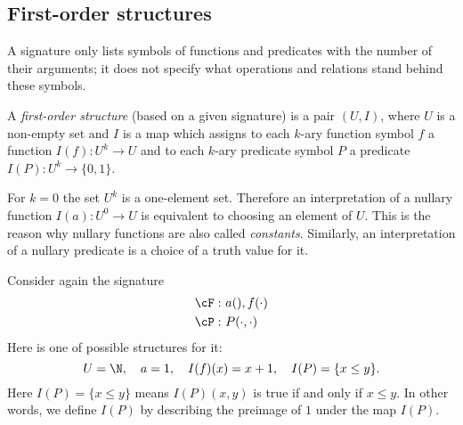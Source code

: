 \begin{page}

\subsection{First-order structures}
A signature only lists symbols of functions and predicates with the number of their arguments;
it does not specify what operations and relations stand behind these symbols.


\end{page}

\begin{page}

\begin{dfn}
A \emph{first-order structure} (based on a given signature) is a pair $(U, I)$, where
$U$ is a non-empty set and $I$ is a map which assigns to each $k$-ary function symbol $f$
a function $I(f) \colon U^k \to U$ and to each $k$-ary predicate symbol $P$ a predicate $I(P) \colon U^k \to \{0,1\}$.
\end{dfn}

\end{page}

\begin{page}


For $k=0$ the set $U^k$ is a one-element set.
Therefore an interpretation of a nullary function $I(a) \colon U^0 \to U$ is equivalent to choosing an element of $U$.
This is the reason why nullary functions are also called \emph{constants}.
Similarly, an interpretation of a nullary predicate is a choice of a truth value for it.


\end{page}

\begin{page}

\begin{exl}
Consider again the signature
\begin{align*}
\cF:\ &a(), f(\cdot) \\
\cP:\ &P(\cdot, \cdot)
\end{align*}
Here is one of possible structures for it:
\[
U = \N, \quad a = 1, \quad I(f)(x) = x+1, \quad I(P) = \{x \le y\}.
\]
Here $I(P) = \{x \le y\}$ means $I(P)(x,y)$ is true if and only if $x \le y$.
In other words, we define $I(P)$ by describing the preimage of $1$ under the map $I(P)$.
\end{exl}

\end{page}


